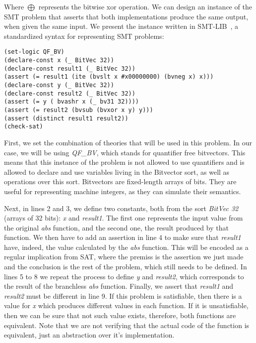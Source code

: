 Where $\bigoplus$ represents the bitwise xor operation. We can design an instance of the SMT problem that asserts that both implementations produce the same output, when given the same input. We present the instance written in SMT-LIB~\cite{smtlib}, a standardized syntax for representing SMT problems:

\begin{verbatim}
(set-logic QF_BV)
(declare-const x (_ BitVec 32))
(declare-const result1 (_ BitVec 32))
(assert (= result1 (ite (bvslt x #x00000000) (bvneg x) x)))
(declare-const y (_ BitVec 32))
(declare-const result2 (_ BitVec 32))
(assert (= y ( bvashr x (_ bv31 32))))
(assert (= result2 (bvsub (bvxor x y) y)))
(assert (distinct result1 result2))
(check-sat)
\end{verbatim}

First, we set the combination of theories that will be used in this problem. In our case, we will be using \textit{QF\_BV}, which stands for quantifier free bitvectors. This means that this instance of the problem is not allowed to use quantifiers and is allowed to declare and use variables living in the Bitvector sort, as well as operations over this sort. Bitvectors are fixed-length arrays of bits. They are useful for representing machine integers, as they can simulate their semantics.

Next, in lines 2 and 3, we define two constants, both from the sort \textit{BitVec 32} (arrays of 32 bits): \textit{x} and \textit{result1}. The first one represents the input value from the original \textit{abs} function, and the second one, the result produced by that function. We then have to add an assertion in line 4 to make sure that \textit{result1} have, indeed, the value calculated by the \textit{abs} function. This will be encoded as a regular implication from SAT, where the premiss is the assertion we just made and the conclusion is the rest of the problem, which still needs to be defined. In lines 5 to 8 we repeat the process to define \textit{y} and \textit{result2}, which corresponds to the result of the branchless \textit{abs} function. Finally, we assert that \textit{result1} and \textit{result2} must be different in line 9. If this problem is satisfiable, then there is a value for \textit{x} which produces different values in each function. If it is unsatisfiable, then we can be sure that not such value exists, therefore, both functions are equivalent. Note that we are not verifying that the actual code of the function is equivalent, just an abstraction over it's implementation.

